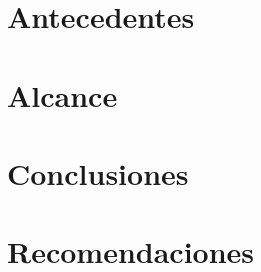 \documentclass[10pt, letterpaper]{report}
\newcommand{\defaultparformat}[1]{
	{\setlength{\parskip}{2ex}
    }
}
\renewcommand\thechapter{\Roman{chapter}}
\begin{document}
\ifdefined\CAPantecedentes
	\newpage
	\chapter{Antecedentes}
	\ifdefined\parpordefecto
    	\defaultparformat{antecedentes}
    \else
    	
    \fi  
\fi

\ifdefined\CAPalcance
	\newpage
	\chapter{Alcance}
	\ifdefined\parpordefecto
    	\defaultparformat{alcance}
    \else
    	
    \fi 
\fi

\newpage
\ifdefined\parpordefecto
	\defaultparformat{capitulos}
\else
	
\fi

\ifdefined\CAPconclusiones
	\newpage
	\chapter{Conclusiones}
	\ifdefined\parpordefecto
		\defaultparformat{conclusiones}
	\else
		
	\fi
\fi

\ifdefined\CAPrecomendaciones
	\newpage
	\chapter{Recomendaciones}
	\ifdefined\parpordefecto
		\defaultparformat{recomendaciones}
	\else
		
	\fi
\fi

\ifdefined\CAPbibliografia
	\newpage
    \cleardoublepage{}
	\ifdefined\usarAPA
		
	\else
		
	\fi
	
\fi

\ifdefined\CAPanexos
	\newpage
    \cleardoublepage{}
    \renewcommand{\chaptername}{Anexo}
    \setcounter{chapter}{0}
	\renewcommand{\thechapter}{\Alph{chapter}}
	\ifdefined\parpordefecto
    	\defaultparformat{anexos}
    \else
    	
    \fi
\fi
\end{document}
